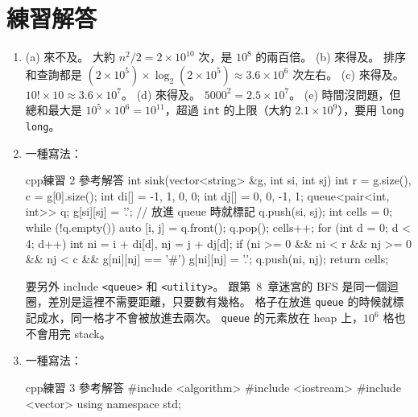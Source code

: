 \section*{練習解答}

\begin{enumerate}
\item (a) 來不及。 大約 $n^2 / 2 = 2 \times 10^{10}$ 次，是 $10^8$ 的兩百倍。
(b) 來得及。 排序和查詢都是 $(2 \times 10^5) \times \log_2(2 \times 10^5)
\approx 3.6 \times 10^6$ 次左右。 (c) 來得及。 $10! \times 10 \approx 3.6
\times 10^7$。 (d) 來得及。 $5000^2 = 2.5 \times 10^7$。 (e) 時間沒問題，但
總和最大是 $10^5 \times 10^6 = 10^{11}$，超過 \texttt{int} 的上限（大約
$2.1 \times 10^9$），要用 \texttt{long long}。
\item 一種寫法：
\begin{code}{cpp}{練習 2 參考解答}
int sink(vector<string> &g, int si, int sj) {
    int r = g.size(), c = g[0].size();
    int di[] = {-1, 1, 0, 0};
    int dj[] = {0, 0, -1, 1};
    queue<pair<int, int>> q;
    g[si][sj] = '.';                   // 放進 queue 時就標記
    q.push({si, sj});
    int cells = 0;
    while (!q.empty()) {
        auto [i, j] = q.front();
        q.pop();
        cells++;
        for (int d = 0; d < 4; d++) {
            int ni = i + di[d], nj = j + dj[d];
            if (ni >= 0 && ni < r && nj >= 0 && nj < c &&
                g[ni][nj] == '#') {
                g[ni][nj] = '.';
                q.push({ni, nj});
            }
        }
    }
    return cells;
}
\end{code}
要另外 include \texttt{<queue>} 和 \texttt{<utility>}。 跟第~8~章迷宮的
BFS 是同一個迴圈，差別是這裡不需要距離，只要數有幾格。 格子在放進
\texttt{queue} 的時候就標記成水，同一格才不會被放進去兩次。 \texttt{queue}
的元素放在 heap 上，$10^6$ 格也不會用完 stack。
\item 一種寫法：
\begin{code}{cpp}{練習 3 參考解答}
#include <algorithm>
#include <iostream>
#include <vector>
using namespace std;


\end{code}
\end{enumerate}
